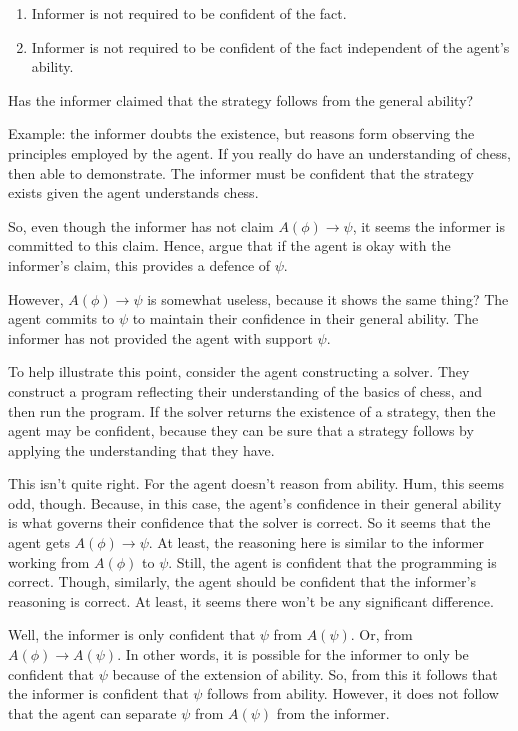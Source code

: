\documentclass[10pt]{article}
\begin{document}
\begin{enumerate}
\item Informer is not required to be confident of the fact.
\item Informer is not required to be confident of the fact independent of the agent's ability.
\end{enumerate}


\begin{note}
Has the informer claimed that the strategy follows from the general ability?

Example: the informer doubts the existence, but reasons form observing the principles employed by the agent.
If you really do have an understanding of chess, then able to demonstrate.
The informer must be confident that the strategy exists given the agent understands chess.

So, even though the informer has not claim \(A(\phi) \rightarrow \psi\), it seems the informer is committed to this claim.
Hence, argue that if the agent is okay with the informer's claim, this provides a defence of \(\psi\).

However, \(A(\phi) \rightarrow \psi\) is somewhat useless, because it shows the same thing?
The agent commits to \(\psi\) to maintain their confidence in their general ability.
The informer has not provided the agent with support \(\psi\).

To help illustrate this point, consider the agent constructing a solver.
They construct a program reflecting their understanding of the basics of chess, and then run the program.
If the solver returns the existence of a strategy, then the agent may be confident, because they can be sure that a strategy follows by applying the understanding that they have.

This isn't quite right.
For the agent doesn't reason from ability.
Hum, this seems odd, though.
Because, in this case, the agent's confidence in their general ability is what governs their confidence that the solver is correct.
So it seems that the agent gets \(A(\phi) \rightarrow \psi\).
At least, the reasoning here is similar to the informer working from \(A(\phi)\) to \(\psi\).
Still, the agent is confident that the programming is correct.
Though, similarly, the agent should be confident that the informer's reasoning is correct.
At least, it seems there won't be any significant difference.

Well, the informer is only confident that \(\psi\) from \(A(\psi)\).
Or, from \(A(\phi) \rightarrow A(\psi)\).
In other words, it is possible for the informer to only be confident that \(\psi\) because of the extension of ability.
So, from this it follows that the informer is confident that \(\psi\) follows from ability.
However, it does not follow that the agent can separate \(\psi\) from \(A(\psi)\) from the informer.


\end{note}
\end{document}
